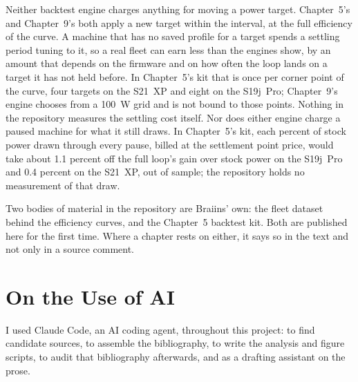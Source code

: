 Neither backtest engine charges anything for moving a power target. Chapter~5's
and Chapter~9's both apply a new target within the interval, at the full
efficiency of the curve. A machine that has no saved profile for a target
spends a settling period tuning to it, so a real fleet can earn less than the
engines show, by an amount that depends on the firmware and on how often the
loop lands on a target it has not held before. In Chapter~5's kit that is once
per corner point of the curve, four targets on the S21~XP and eight on the
S19j~Pro; Chapter~9's engine chooses from a 100~W grid and is not bound to
those points. Nothing in the repository measures the settling cost
itself. %
Nor does either engine charge a paused machine for what it still draws. In
Chapter~5's kit, each percent of stock power drawn through every pause, billed
at the settlement point price, would take about 1.1 percent off the full loop's gain
over stock power on the S19j~Pro and 0.4 percent on the S21~XP, out of sample;
the repository holds no measurement of that draw. %

Two bodies of material in the repository are Braiins' own: the fleet
dataset behind the efficiency curves, and the Chapter~5 backtest kit. Both are
published here for the first time. Where a chapter rests on either, it says so
in the text and not only in a source comment. %

\section*{On the Use of AI}

I used Claude Code, an AI coding agent, throughout this project: to find
candidate sources, to assemble the bibliography, to write the analysis and
figure scripts, to audit that bibliography afterwards, and as a drafting
assistant on the prose.

\endgroup
